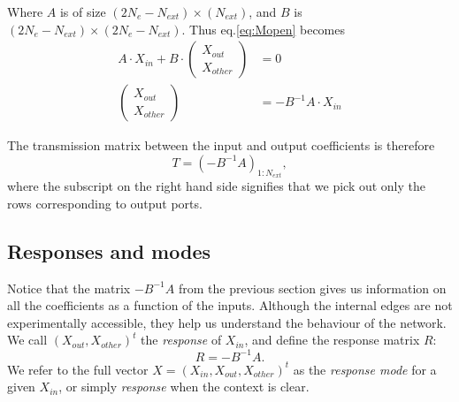 Where $A$ is of size $(2N_e-N_{ext}) \times (N_{ext})$, and $B$ is $(2N_e-N_{ext}) \times (2N_e-N_{ext})$. Thus eq.\ref{eq:Mopen} becomes
\begin{subequations}
\begin{align}
    A\cdot X_{in} + B\cdot \begin{pmatrix}X_{out}\\X_{other}  \end{pmatrix}  &= 0 \\
    \begin{pmatrix}X_{out}\\X_{other}  \end{pmatrix} &= -B^{-1}A \cdot X_{in}
\end{align}
\end{subequations}

The transmission matrix between the input and output coefficients is therefore 
\begin{equation}
    \label{eq:T}
    T = (-B^{-1}A)_{1:N_{ext}},
\end{equation}
where the subscript on the right hand side signifies that we pick out only the rows corresponding to output ports.

\subsection{Responses and modes}
\label{sec:response_mode_def}
Notice that the matrix $-B^{-1}A$ from the previous section gives us information on all the coefficients as a function of the inputs. Although the internal edges are not experimentally accessible, they help us understand the behaviour of the network. We call $(X_{out},X_{other})^t$ the \textit{response} of $X_{in}$, and define the response matrix $R$:
\begin{equation}
    \label{eq:R}
    R = -B^{-1}A.
\end{equation}
We refer to the full vector $X=(X_{in},X_{out},X_{other})^t$ as the \textit{response mode} for a given $X_{in}$, or simply \textit{response} when the context is clear.

